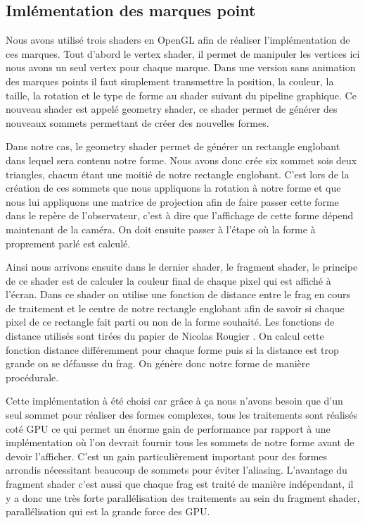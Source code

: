 \documentclass[12pt]{article}
\begin{document}

\subsection{Imlémentation des marques point}

Nous avons utilisé trois shaders en OpenGL afin de réaliser l'implémentation de ces marques. Tout d'abord le vertex shader, il permet de manipuler les vertices ici nous avons un seul vertex pour chaque marque. Dans une version sans animation des marques points il faut simplement transmettre la position, la couleur, la taille, la rotation et le type de forme au shader suivant du pipeline graphique. Ce nouveau shader est appelé geometry shader, ce shader permet de générer des nouveaux sommets permettant de créer des nouvelles formes.

Dans notre cas, le geometry shader permet de générer un rectangle englobant dans lequel sera contenu notre forme. Nous avons donc crée six sommet sois deux triangles, chacun étant une moitié de notre rectangle englobant. C'est lors de la création de ces sommets que nous appliquons la rotation à notre forme et que nous lui appliquons une matrice de projection afin de faire passer cette forme dans le repère de l'observateur, c'est à dire que l'affichage de cette forme dépend maintenant de la caméra. On doit ensuite passer à l'étape où la forme à proprement parlé est calculé.

Ainsi nous arrivons ensuite dans le dernier shader, le fragment shader, le principe de ce shader est de calculer la couleur final de chaque pixel qui est affiché à l'écran. Dans ce shader on utilise une fonction de distance entre le \gls{frag} en cours de traitement et le centre de notre rectangle englobant afin de savoir si chaque pixel de ce rectangle fait parti ou non de la forme souhaité. Les fonctions de distance utilisés sont tirées du papier de Nicolas Rougier \cite{Rougier}. On calcul cette fonction distance différemment pour chaque forme puis si la distance est trop grande on se défausse du \gls{frag}. On génère donc notre forme de manière procédurale.

Cette implémentation à été choisi car grâce à ça nous n'avons besoin que d'un seul sommet pour réaliser des formes complexes, tous les traitements sont réalisés coté GPU ce qui permet un énorme gain de performance par rapport à une implémentation où l'on devrait fournir tous les sommets de notre forme avant de devoir l'afficher. C'est un gain particulièrement important pour des formes arrondis nécessitant beaucoup de sommets pour éviter l'aliasing.
L'avantage du fragment shader c'est aussi que chaque \gls{frag} est traité de manière indépendant, il y a donc une très forte parallélisation des traitements au sein du fragment shader, parallélisation qui est la grande force des GPU.
\end{document}
